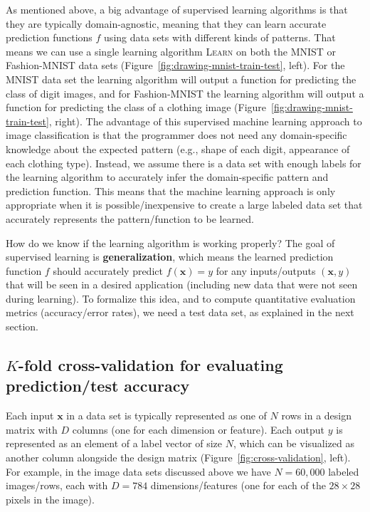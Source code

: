\documentclass[12pt]{article}
\newcommand{\keyword}[1]{\textbf{#1}}
\begin{document}
As mentioned above, a big advantage of supervised learning algorithms
is that they are typically domain-agnostic, meaning that they can
learn accurate prediction functions $f$ using data sets with different
kinds of patterns. That means we can use a single learning algorithm
\textsc{Learn} on both the MNIST or Fashion-MNIST data sets
(Figure~\ref{fig:drawing-mnist-train-test}, left). For the MNIST data
set the learning algorithm will output a function for predicting the
class of digit images, and for Fashion-MNIST the learning algorithm
will output a function for predicting the class of a clothing image
(Figure~\ref{fig:drawing-mnist-train-test}, right). The advantage of
this supervised machine learning approach to image classification is
that the programmer does not need any domain-specific knowledge about
the expected pattern (e.g., shape of each digit, appearance of each
clothing type). Instead, we assume there is a data set with enough
labels for the learning algorithm to accurately infer the
domain-specific pattern and prediction function. This means that the
machine learning approach is only appropriate when it is
possible/inexpensive to create a large labeled data set that
accurately represents the pattern/function to be learned.

How do we know if the learning algorithm is working properly? The goal
of supervised learning is \keyword{generalization}, which means the
learned prediction function $f$ should accurately predict
$f(\mathbf x) = y$ for any inputs/outputs $(\mathbf x,y)$ that will be
seen in a desired application (including new data that were not seen
during learning). To formalize this idea, and to compute quantitative
evaluation metrics (accuracy/error rates), we need a test data set, as
explained in the next section.

\subsection{$K$-fold cross-validation for evaluating prediction/test accuracy}

Each input $\mathbf x$ in a data set is typically represented as one
of $N$ rows in a design matrix with $D$ columns (one for each
dimension or feature). Each output $y$ is represented as an element of
a label vector of size $N$, which can be visualized as another column
alongside the design matrix (Figure~\ref{fig:cross-validation},
left). For example, in the image data sets discussed above we have
$N=60,000$ labeled images/rows, each with $D=784$ dimensions/features
(one for each of the $28\times 28$ pixels in the image).
\end{document}

